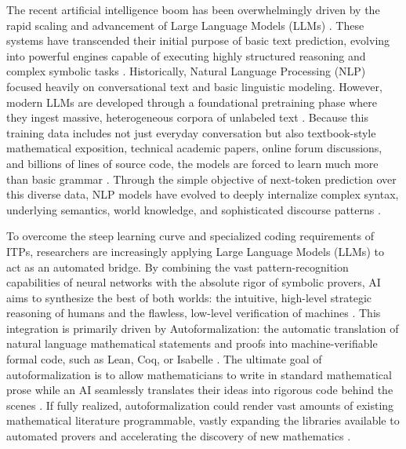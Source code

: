 The recent artificial intelligence boom has been overwhelmingly driven by the rapid scaling and advancement of Large Language Models (LLMs) \cite{asperti_thinking_2026}. These systems have transcended their initial purpose of basic text prediction, evolving into powerful engines capable of executing highly structured reasoning and complex symbolic tasks \cite{asperti_thinking_2026}. Historically, Natural Language Processing (NLP) focused heavily on conversational text and basic linguistic modeling. However, modern LLMs are developed through a foundational pretraining phase where they ingest massive, heterogeneous corpora of unlabeled text \cite{asperti_thinking_2026}. Because this training data includes not just everyday conversation but also textbook-style mathematical exposition, technical academic papers, online forum discussions, and billions of lines of source code, the models are forced to learn much more than basic grammar \cite{asperti_thinking_2026}. Through the simple objective of next-token prediction over this diverse data, NLP models have evolved to deeply internalize complex syntax, underlying semantics, world knowledge, and sophisticated discourse patterns \cite{asperti_thinking_2026}.

To overcome the steep learning curve and specialized coding requirements of ITPs, researchers are increasingly applying Large Language Models (LLMs) to act as an automated bridge. By combining the vast pattern-recognition capabilities of neural networks with the absolute rigor of symbolic provers, AI aims to synthesize the best of both worlds: the intuitive, high-level strategic reasoning of humans and the flawless, low-level verification of machines \cite{avigad_mathematics_2024}. This integration is primarily driven by Autoformalization: the automatic translation of natural language mathematical statements and proofs into machine-verifiable formal code, such as Lean, Coq, or Isabelle \cite{asperti_thinking_2026, chan_lean-ing_2025-1}. The ultimate goal of autoformalization is to allow mathematicians to write in standard mathematical prose while an AI seamlessly translates their ideas into rigorous code behind the scenes \cite{asperti_thinking_2026, biyani_indimathbench_2025-1}. If fully realized, autoformalization could render vast amounts of existing mathematical literature programmable, vastly expanding the libraries available to automated provers and accelerating the discovery of new mathematics \cite{chan_lean-ing_2025-1}.

